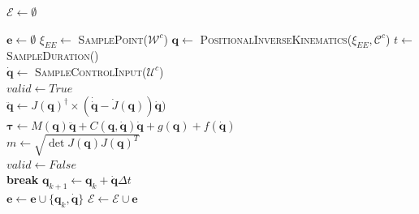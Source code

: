 \begin{algorithm}\footnotesize

\caption{Generate Kinodynamic Manifold.}\label{algo:generate-kinodynamic-manifold}


$\mathcal{E} \longleftarrow \emptyset$

 {
    $\mathbf{e} \longleftarrow \emptyset$ 
    $\xi_{EE} \longleftarrow$ \textsc{SamplePoint}($\mathcal{W}^c$) 
    $\mathbf{q} \longleftarrow$ \textsc{PositionalInverseKinematics}($\xi_{EE}, \mathcal{C}^c$) 
    $t \longleftarrow$ \textsc{SampleDuration}()\\
    $\mathbf{\dot{q}} \longleftarrow$ \textsc{SampleControlInput}($\mathcal{U}^c$) \\
    $valid \longleftarrow True$ \\
     {
        $\ddot{\mathbf{q}} \longleftarrow J(\mathbf{q})^\dagger \times (\dot{\mathbf{\dot{q}}} - \dot{J}(\mathbf{q}))\mathbf{\dot{q}})$\\
        $\mathbf{\tau} \longleftarrow M(\mathbf{q})\ddot{\mathbf{q}} + C(\mathbf{q}, \mathbf{\dot{q}})\mathbf{\dot{q}} + g(\mathbf{q}) + f(\mathbf{\dot{q}})$\\
        $m \longleftarrow \sqrt{\det{J(\mathbf{q})J(\mathbf{q})^T}}$ \\
        { 
            $valid \longleftarrow False$\\
            \textbf{break}
        }
        $\mathbf{q}_{k+1} \longleftarrow \mathbf{q}_{k} + \mathbf{\dot{q}} \Delta t$ \\
        $\mathbf{e} \longleftarrow \mathbf{e} \cup \{\mathbf{q}_k, \mathbf{\dot{q}}\}$
    }
     {
            $\mathcal{E} \longleftarrow \mathcal{E} \cup \mathbf{e}$
    }

}

\end{algorithm}